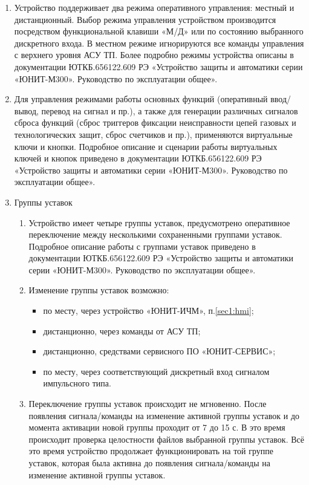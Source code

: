 \begin{enumerate}[label=\arabic{section}.\arabic{subsection}.\arabic*, labelsep=4pt, leftmargin=0pt, itemindent=57pt]
\item
Устройство поддерживает два режима оперативного управления: местный и дистанционный. Выбор режима управления устройством производится посредством функциональной клавиши «М/Д» или по состоянию выбранного дискретного входа. В местном режиме игнорируются все команды управления с верхнего уровня АСУ ТП. Более подробно режимы устройства описаны в документации ЮТКБ.656122.609 РЭ «Устройство защиты и автоматики серии «ЮНИТ-М300». Руководство по эксплуатации общее».
\item
Для управления режимами работы основных функций (оперативный ввод/вывод, перевод на сигнал и пр.), а также для генерации различных сигналов сброса функций (сброс триггеров фиксации неисправности цепей газовых и технологических защит, сброс счетчиков и пр.), применяются виртуальные ключи и кнопки. Подробное описание и сценарии работы виртуальных ключей и кнопок приведено в документации ЮТКБ.656122.609 РЭ «Устройство защиты и автоматики серии «ЮНИТ-М300». Руководство по эксплуатации общее». 

\item Группы уставок
\begin{enumerate}[label=\arabic{section}.\arabic{subsection}.\arabic{enumi}.\arabic*, labelsep=4pt, leftmargin=0em, itemindent=65pt, parsep=0pt]

\item Устройство имеет четыре группы уставок, предусмотрено оперативное переключение между несколькими сохраненными группами уставок. Подробное описание работы с группами уставок приведено в документации ЮТКБ.656122.609 РЭ «Устройство защиты и автоматики серии «ЮНИТ-М300». Руководство по эксплуатации общее».

\item
Изменение группы уставок возможно:
\begin{itemize}
    \item по месту, через устройство «ЮНИТ-ИЧМ», п.\ref{sec1:hmi};
    \item дистанционно, через команды от АСУ ТП;
    \item дистанционно, средствами сервисного ПО «ЮНИТ-СЕРВИС»;
    \item по месту, через соответствующий дискретный вход сигналом импульсного типа.
\end{itemize}
\item
Переключение группы уставок происходит не мгновенно. После появления сигнала/команды на изменение активной группы уставок и до момента активации новой группы проходит от 7 до 15 с. В это
время происходит проверка целостности файлов выбранной группы уставок. Всё это время устройство продолжает функционировать на той группе уставок, которая была активна до появления сигнала/команды на изменение активной группы уставок.


\end{enumerate}
\end{enumerate}
